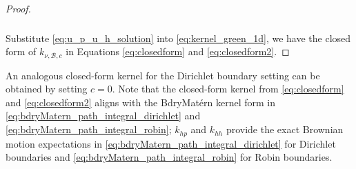 \documentclass[aos,preprint]{imsart}
\theoremstyle{plain}
\newcommand{\Real}{\mathbb R}
\theoremstyle{remark}
\begin{document}
\begin{proof}
\begin{align}
\begin{split}
\end{split}
\label{eq:u_p_u_h_solution}
\end{align}
Substitute \eqref{eq:u_p_u_h_solution} into \eqref{eq:kernel_green_1d}, we have the closed form of $k_{\nu,\mathcal{B},c}$ in Equations \eqref{eq:closedform} and \eqref{eq:closedform2}.
\end{proof}


\noindent An analogous closed-form kernel for the Dirichlet boundary setting can be obtained by setting $c=0$. Note that the closed-form kernel from \eqref{eq:closedform} and \eqref{eq:closedform2} aligns with the BdryMat\'ern kernel form in \eqref{eq:bdryMatern_path_integral_dirichlet} and \eqref{eq:bdryMatern_path_integral_robin}; $k_{hp}$ and $k_{hh}$ provide the exact Brownian motion expectations in \eqref{eq:bdryMatern_path_integral_dirichlet} for Dirichlet boundaries and \eqref{eq:bdryMatern_path_integral_robin} for Robin boundaries.
\end{document}
